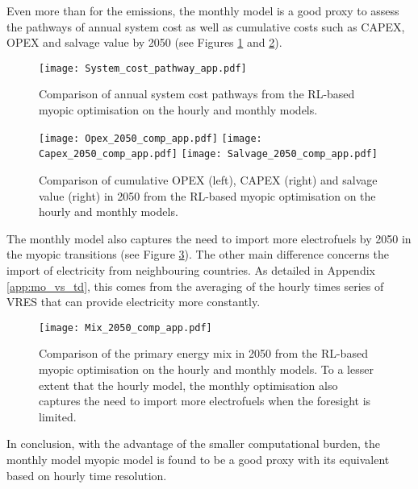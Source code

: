 

Even more than for the emissions, the monthly model is a good proxy to assess the pathways of annual system cost as well as cumulative costs such as CAPEX, OPEX and salvage value by 2050 (see Figures \ref{fig:app:System_cost_pathway} and \ref{fig:app:Opex_Capex_Salvage_comp}).

\begin{figure}[!htbp]
\centering
\texttt{[image: System\_cost\_pathway\_app.pdf]}
\caption{Comparison of annual system cost pathways from the \gls{RL}-based myopic optimisation on the hourly and monthly models.}
\label{fig:app:System_cost_pathway}
\end{figure}

\begin{figure}[!htbp]
\centering
\texttt{[image: Opex\_2050\_comp\_app.pdf]}
\texttt{[image: Capex\_2050\_comp\_app.pdf]}
\texttt{[image: Salvage\_2050\_comp\_app.pdf]}
\caption{Comparison of cumulative OPEX (left), CAPEX (right) and salvage value (right) in 2050 from the \gls{RL}-based myopic optimisation on the hourly and monthly models.}
\label{fig:app:Opex_Capex_Salvage_comp}
\end{figure}

\newpage
The monthly model also captures the need to import more electrofuels by 2050 in the myopic transitions (see Figure \ref{fig:app:Mix_2050_comp}). The other main difference concerns the import of electricity from neighbouring countries. As detailed in Appendix \ref{app:mo_vs_td}, this comes from the averaging of the hourly times series of \gls{VRES} that can provide electricity more constantly.

\begin{figure}[!htbp]
\centering
\texttt{[image: Mix\_2050\_comp\_app.pdf]}
\caption{Comparison of the primary energy mix in 2050 from the \gls{RL}-based myopic optimisation on the hourly and monthly models. To a lesser extent that the hourly model, the monthly optimisation also captures the need to import more electrofuels when the foresight is limited.}
\label{fig:app:Mix_2050_comp}
\end{figure}

In conclusion, with the advantage of the smaller computational burden, the monthly model myopic model is found to be a good proxy with its equivalent based on hourly time resolution.